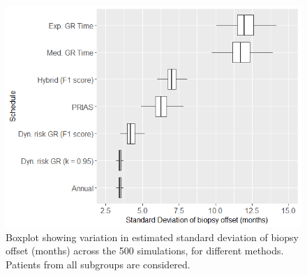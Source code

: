 \begin{figure}[!htb]
\centerline{\includegraphics[width=\columnwidth]{images/sim_study/offsetSDBoxPlot_all.png}}
\caption{Boxplot showing variation in estimated standard deviation of biopsy offset (months) across the 500 simulations, for different methods. Patients from all subgroups are considered.}
\label{fig : offsetSDBoxPlot_all}
\end{figure}



